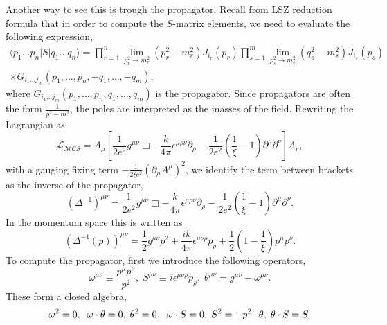 \documentclass{article}
\begin{document}
Another way to see this is trough the propagator. Recall from LSZ reduction formula that in order to compute the $S$-matrix elements, we need to evaluate the following expression, 
\begin{equation}\label{lsz formula}
	\begin{split}
		\langle p_1\dots p_n | S | q_1\dots q_n\rangle = \prod_{r=1}^{n}\lim_{p^2_r\to m^2_r}(p_r^2-m_r^2)J_{i_{r}}(p_r)\prod_{s=1}^{m}\lim_{p^2_s\to m^2_s}(q_s^2-m_s^2)J_{i_{s}}(p_s)\\\times G_{i_{1}\dots j_{m}}(p_1,\dots,p_n,-q_1,\dots,-q_m),
	\end{split}
\end{equation}
where $ G_{i_{1}\dots j_{m}}(p_1,\dots,p_n,q_1,\dots,q_m)$ is the propagator. Since propagators are often the form $\frac{1}{p^2-m^2}$, the poles are interpreted as the masses of the field.  
Rewriting the Lagrangian as 
\begin{equation*}
	\mathcal{L_{\text{MCS}}}=A_{\mu}\left[\frac{1}{2e^2}g^{\mu\nu}\Box-\frac{k}{4\pi}\epsilon^{\mu\rho\nu}\partial_{\rho}-\frac{1}{2e^2}\left(\frac{1}{\xi}-1\right)\partial^{\mu}\partial^{\nu}\right]A_{v},
\end{equation*}
with a gauging fixing term $-\frac{1}{2\xi e^2 }(\partial_\mu A^\mu)^2$, we identify the term between brackets as the inverse of the propagator, 
\begin{equation}
	(\Delta^{-1})^{\mu\nu}=\frac{1}{2e^2}g^{\mu\nu}\Box-\frac{k}{4\pi}\epsilon^{\mu\rho\nu}\partial_{\rho}-\frac{1}{2e^2}\left(\frac{1}{\xi}-1\right)\partial^{\mu}\partial^{\nu}.
\end{equation}
In the momentum space this is written as 
\begin{equation}
	(\Delta^{-1}(p))^{\mu\nu}=\frac{1}{2}g^{\mu\nu}p^2+\frac{ik}{4\pi}\epsilon^{\mu\nu\rho}p_\rho+\frac{1}{2}\left(1-\frac{1}{\xi}\right)p^\mu p^\nu.
\end{equation}
To compute the propagator, first we introduce the following operators,
\begin{equation}
	\omega^{\mu\nu}\equiv\frac{p^\mu p^\nu}{p^2},\;S^{\mu\nu}\equiv i\epsilon^{\mu\nu\rho}p_\rho,\;\theta^{\mu\nu}=g^{\mu\nu}-\omega^{\mu\nu}.
\end{equation} 
These form a closed algebra,
\begin{equation}
	\omega^2=0,\;\;\omega\cdot\theta=0,\;\;\\\theta^2=0,\;\;\omega\cdot S=0,\;\;\\S^2=-p^2\cdot\theta,\;\theta\cdot S=S.
\end{equation}
\end{document}
